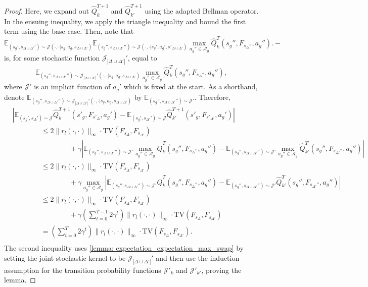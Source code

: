 \documentclass{article}
\theoremstyle{plain}
\theoremstyle{definition}
\def\E{\mathbb{E}}
\begin{document}
\begin{proof}
\noindent Here, we expand out $\hat{Q}_k^{T+1}$ and $\hat{Q}_{k'}^{T+1}$ using the adapted Bellman operator. In the ensuing inequality, we apply the triangle inequality and bound the first term using the base case. Then, note that \[\E_{(s_g',s_{\Delta\cup\Delta'}')\sim\mathcal{J}(\cdot,\cdot|s_g, a_g, s_{\Delta\cup\Delta'})} \E_{(s_g'',s_{\Delta\cup\Delta'}'')\sim\mathcal{J}(\cdot,\cdot|s_g', a_g', s'_{\Delta\cup\Delta'})}\max_{a_g''\in\mathcal{A}_g} \hat{Q}_k^T(s_g'',F_{s_\Delta''},a_g'').-\]
is, for some stochastic function $\mathcal{J}_{|\Delta\cup\Delta'|}'$, equal to \[\E_{(s_g'', s_{\Delta\cup\Delta'}'')\sim\mathcal{J}_{|\Delta\cup\Delta'|}'(\cdot,\cdot|s_g, a_g, s_{\Delta\cup\Delta'})}\max_{a_g''\in\mathcal{A}_g}\hat{Q}_k^T(s_g'', F_{s_\Delta''}, a_g''),\] where $\mathcal{J}'$ is an implicit function of $a_g'$ which is fixed at the start. 
As a shorthand, denote $\E_{(s_g'',s_{\Delta\cup\Delta'}'')\sim\mathcal{J}_{|\Delta\cup\Delta'|}'(\cdot,\cdot|s_g, a_g, s_{\Delta\cup\Delta'})}$ by $\E_{(s_g'',s_{\Delta\cup\Delta'}'')\sim\mathcal{J}'}$. Therefore,
\begin{align*}
&|\E_{(s_g',s_\Delta')\sim{\mathcal{J}}} \hat{Q}_k^{T+1}(s'_g,F_{s'_\Delta},a_g') -\E_{(s_g',s_{\Delta'}')\sim{\mathcal{J}}}\hat{Q}_{k'}^{T+1}(s'_g, F_{s'_{\Delta'}}, a_g')| \\
&\quad\quad\quad\quad\leq 2\|r_l(\cdot,\cdot)\|_\infty \cdot \mathrm{TV}(F_{s_\Delta}, F_{s_{\Delta'}}) \\
&\quad\quad\quad \quad \quad\quad\quad\quad+ \gamma|\E_{(s_g'',s_{\Delta\cup\Delta'}'')\sim{\mathcal{J}'}}\max_{a_g''\in\mathcal{A}_g} \hat{Q}_k^T(s_g'',F_{s_\Delta''},a_g'')
 -\E_{(s_g'',s_{\Delta\cup\Delta'}'')\sim{\mathcal{J}'}}\max_{a_g''\in\mathcal{A}_g} \hat{Q}_{k'}^T(s_g'',F_{s_{\Delta'}''}, a_g'')| \\
&\quad\quad\quad\quad \leq 2\|r_l(\cdot,\cdot)\|_\infty\cdot \mathrm{TV}(F_{s_\Delta}, F_{s_{\Delta'}}) \\
&\quad\quad\quad\quad\quad\quad\quad\quad+ \gamma\max_{a_g''\in\mathcal{A}_g}|\E_{(s_g'',s_{\Delta\cup\Delta'}'')\sim{\mathcal{J}'}} \hat{Q}^T_k(s_g'',F_{s_\Delta''},a_g'') 
 - \E_{(s_g'',s_{\Delta\cup\Delta'}'')\sim{\mathcal{J}'}} \hat{Q}^T_{k'}(s_g'',F_{s_{\Delta'}''},a_g'')| \\ 
&\quad\quad\quad\quad\leq 2\|r_l(\cdot,\cdot)\|_\infty\cdot\mathrm{TV}(F_{s_\Delta}, F_{s_{\Delta'}}) \\
&\quad\quad\quad\quad\quad\quad\quad\quad + \gamma\left(\sum_{t=0}^{T-1}2\gamma^t\right)\|r_l(\cdot,\cdot)\|_\infty\cdot \mathrm{TV}(F_{s_\Delta}, F_{s_{\Delta'}}) \\
&\quad\quad\quad\quad=  \left(\sum_{t=0}^{T}2\gamma^t\right)\|r_l(\cdot,\cdot)\|_\infty \cdot \mathrm{TV}(F_{s_\Delta},F_{s_{\Delta'}}).\\
\end{align*}
The second inequality uses \cref{lemma: expectation_expectation_max_swap} by setting the joint stochastic kernel to be $\mathcal{J}_{|\Delta\cup\Delta'|}'$ and then use the induction assumption for the transition probability functions $\mathcal{J}'_k$ and $\mathcal{J}'_{k'}$, proving the lemma.\qedhere 
\end{proof}
\end{document}
